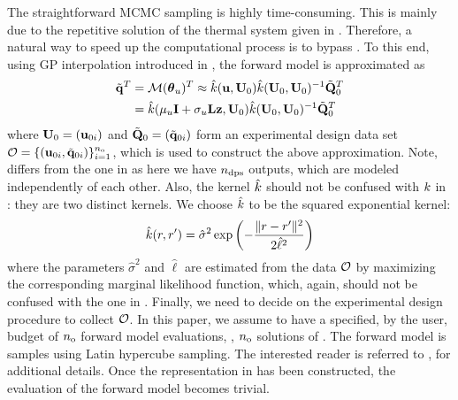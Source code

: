 The straightforward MCMC sampling is highly time-consuming. This is mainly due to the repetitive solution of the thermal system given in . Therefore, a natural way to speed up the computational process is to bypass . To this end, using GP interpolation introduced in , the forward model is approximated as
\begin{align}
  \mvT^T & = \model{\vparam_\u}^T \approx \hat{\fCov}(\vu, \mU_0) \hat{\fCov}(\mU_0, \mU_0)^{-1} \mmT_0^T \nonumber \\
  & = \hat{\fCov}(\mu_\u \vI + \sigma_\u \mKL \vz, \mU_0) \hat{\fCov}(\mU_0, \mU_0)^{-1} \mmT_0^T \elabel{gp-approximation}
\end{align}
where $\mathbf{U}_0 = (\mathbf{u}_{0i})$ and $\tilde{\mathbf{Q}}_0 = (\tilde{\mathbf{q}}_{0i})$ form an experimental design data set $\mathcal{O} = \{ (\mathbf{u}_{0i}, \tilde{\mathbf{q}}_{0i}) \}_{i = 1}^{n_\text{o}}$, which is used to construct the above approximation. Note,  differs from the one in  as here we have ${n_\text{dps}}$ outputs, which are modeled independently of each other. Also, the kernel $\hat{\fCov}$ should not be confused with $\fCov$ in : they are two distinct kernels. We choose $\hat{\fCov}$ to be the squared exponential kernel:
\[
  \hat{\fCov}(\r, \r') = \hat{\sigma}^2 \exp\left(-\frac{\norm{\r - \r'}^2}{2 \hat{\ell}^2}\right)
\]
where the parameters $\hat{\sigma}^2$ and $\hat{\ell}$ are estimated from the data $\mathcal{O}$ by maximizing the corresponding marginal likelihood function, which, again, should not be confused with the one in . Finally, we need to decide on the experimental design procedure to collect $\mathcal{O}$. In this paper, we assume to have a specified, by the user, budget of ${n_\text{o}}$ forward model evaluations, \ie, ${n_\text{o}}$ solutions of . The forward model is samples using Latin hypercube sampling. The interested reader is referred to \eg, \cite{rasmussen2006} for additional details. Once the representation in  has been constructed, the evaluation of the forward model becomes trivial.
